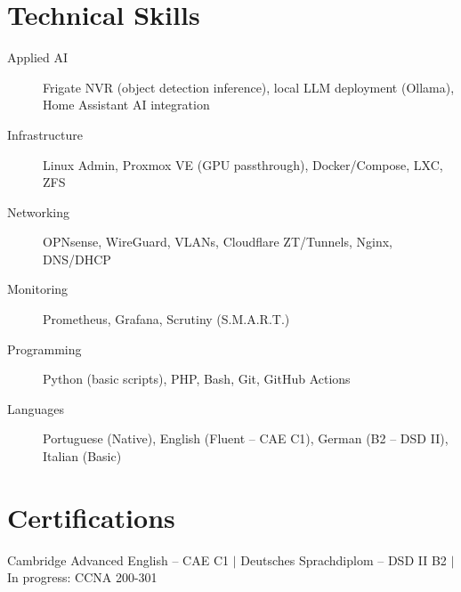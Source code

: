 \documentclass[10.5pt]{article}
\begin{document}
\section{Technical Skills}
\begin{description}
    \item[Applied AI] Frigate NVR (object detection inference), local LLM deployment (Ollama), Home Assistant AI integration
    \item[Infrastructure] Linux Admin, Proxmox VE (GPU passthrough), Docker/Compose, LXC, ZFS
    \item[Networking] OPNsense, WireGuard, VLANs, Cloudflare ZT/Tunnels, Nginx, DNS/DHCP
    \item[Monitoring] Prometheus, Grafana, Scrutiny (S.M.A.R.T.)
    \item[Programming] Python (basic scripts), PHP, Bash, Git, GitHub Actions
    \item[Languages] Portuguese (Native), English (Fluent -- CAE C1), German (B2 -- DSD II), Italian (Basic)
\end{description}

\section{Certifications}
Cambridge Advanced English -- CAE C1 $|$ Deutsches Sprachdiplom -- DSD II B2 $|$ In progress: CCNA 200-301
\end{document}
